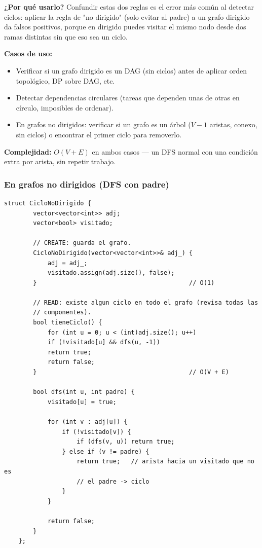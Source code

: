\documentclass[10pt,a4paper,twocolumn]{article}
\begin{document}
\textbf{¿Por qué usarlo?} Confundir estas dos reglas es el error más
común al detectar ciclos: aplicar la regla de "no dirigido" (solo
evitar al padre) a un grafo dirigido da falsos positivos, porque en
dirigido puedes visitar el mismo nodo desde dos ramas distintas sin
que eso sea un ciclo.

\textbf{Casos de uso:}

\begin{itemize}
	\item Verificar si un grafo dirigido es un DAG (sin ciclos) antes
	de aplicar orden topológico, DP sobre DAG, etc.
	\item Detectar dependencias circulares (tareas que dependen unas
	de otras en círculo, imposibles de ordenar).
	\item En grafos no dirigidos: verificar si un grafo es un árbol
	($V-1$ aristas, conexo, sin ciclos) o encontrar el primer ciclo
	para removerlo.
\end{itemize}

\textbf{Complejidad:} $O(V + E)$ en ambos casos — un DFS normal con
una condición extra por arista, sin repetir trabajo.

\subsubsection{En grafos no dirigidos (DFS con padre)}

\begin{lstlisting}[style=cpp]
	struct CicloNoDirigido {
		vector<vector<int>> adj;
		vector<bool> visitado;
		
		// CREATE: guarda el grafo.
		CicloNoDirigido(vector<vector<int>>& adj_) {
			adj = adj_;
			visitado.assign(adj.size(), false);
		}                                          // O(1)
		
		// READ: existe algun ciclo en todo el grafo (revisa todas las
		// componentes).
		bool tieneCiclo() {
			for (int u = 0; u < (int)adj.size(); u++)
			if (!visitado[u] && dfs(u, -1))
			return true;
			return false;
		}                                          // O(V + E)
		
		bool dfs(int u, int padre) {
			visitado[u] = true;
			
			for (int v : adj[u]) {
				if (!visitado[v]) {
					if (dfs(v, u)) return true;
				} else if (v != padre) {
					return true;   // arista hacia un visitado que no es
					// el padre -> ciclo
				}
			}
			
			return false;
		}
	};
\end{lstlisting}
\end{document}
